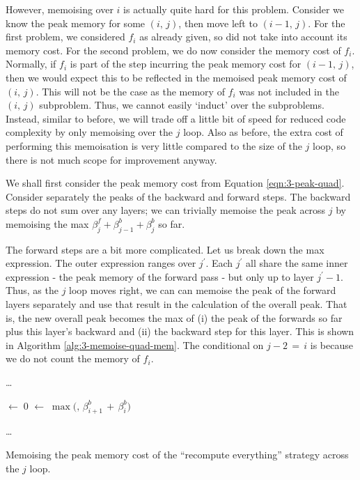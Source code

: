However, memoising over  \(i\) is actually quite hard for this problem.
Consider we know the peak memory for some \((i,\,j)\), then move left to \((i-1,\,j)\).
For the first problem, we considered \(f_i\) as already given, so did not take into account its memory cost.
For the second problem, we do now consider the memory cost of \(f_i\).
Normally, if \(f_i\) is part of the step incurring the peak memory cost for \((i-1,\,j)\), then we would expect this to be reflected in the memoised peak memory cost of \((i,\,j)\).
This will not be the case as the memory of \(f_i\) was not included in the \((i,\,j)\) subproblem.
Thus, we cannot easily `induct' over the subproblems.
Instead, similar to before, we will trade off a little bit of speed for reduced code complexity by only memoising over the \(j\) loop.
Also as before, the extra cost of performing this memoisation is very little compared to the size of the \(j\) loop, so there is not much scope for improvement anyway.

We shall first consider the peak memory cost from Equation \ref{eqn:3-peak-quad}.
Consider separately the peaks of the backward and forward steps.
The backward steps do not sum over any layers;
we can trivially memoise the peak across \(j\) by memoising the max \(\beta^f_j + \beta^b_{j-1} + \beta^b_{j}\) so far.

The forward steps are a bit more complicated.
Let us break down the max expression.
The outer expression ranges over \(j^\prime\).
Each \(j^\prime\) all share the same inner expression - the peak memory of the forward pass - but only  up to layer \(j^\prime -1\).
Thus, as the \(j\) loop moves right, we can can memoise the peak of the forward layers separately and use that result in the calculation of the overall peak.
That is, the new overall peak becomes the max of (i) the peak of the forwards so far plus this layer's backward and (ii) the backward step for this layer.
This is shown in Algorithm \ref{alg:3-memoise-quad-mem}. The conditional on \(j-2\,=\,i\) is because we do not count the memory of \(f_i\).

\begin{algorithm}[htb]
    \DontPrintSemicolon

    \ldots\;
    \BlankLine

    \PeakF \(\leftarrow\; 0\)\;
    \PeakQuad \(\leftarrow\; \max(\)\PeakF\(,\, \beta^b_{i+1}\,+\,\beta^b_i)\)\;
    \BlankLine

    \ldots\;
    \caption{Memoising the peak memory cost of the ``recompute everything'' strategy across the \(j\) loop.}
    \label{alg:3-memoise-quad-mem}
\end{algorithm}

